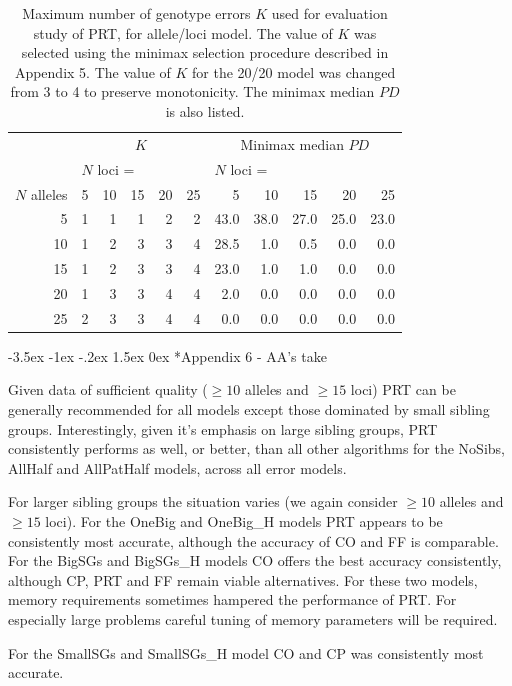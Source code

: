 \documentclass[twoside,10pt,twocolumn]{article}
\makeatletter
\renewcommand\section{\@startsection {section}{1}{\z@}%
                                   {-3.5ex \@plus -1ex \@minus -.2ex}%
                                   {1.5ex \@plus 0ex}%
                                   {\normalfont\normalsize\bfseries}}
\makeatother
\begin{document}
\begin{table}
\caption{Maximum number of genotype errors $K$ used for evaluation study of PRT, for allele/loci model. The 
value of $K$ was selected using the minimax selection procedure described in Appendix 5. The value of $K$ 
for the 20/20 model was changed from 3 to 4 to preserve monotonicity. The minimax median $PD$ is also 
listed.}\label{k.table}
\centering
\begin{tabular}{r|rrrrr|rrrrr} \hline
  & \multicolumn{5}{c|}{$K$} & \multicolumn{5}{c}{Minimax median $PD$} \\
 & \multicolumn{5}{l|}{$N$ loci =} & \multicolumn{5}{l}{$N$ loci =} \\
$N$ alleles  & 5 & 10 & 15 & 20 & 25 & 5 & 10 & 15 & 20 & 25 \\ 
  \hline
5 & 1 & 1 & 1 & 2 & 2 & 43.0 & 38.0 & 27.0 & 25.0 & 23.0 \\ 
  10 & 1 & 2 & 3 & 3 & 4 & 28.5 & 1.0 & 0.5 & 0.0 & 0.0 \\ 
  15 & 1 & 2 & 3 & 3 & 4 & 23.0 & 1.0 & 1.0 & 0.0 & 0.0 \\ 
  20 & 1 & 3 & 3 & 4 & 4 & 2.0 & 0.0 & 0.0 & 0.0 & 0.0 \\ 
  25 & 2 & 3 & 3 & 4 & 4 & 0.0 & 0.0 & 0.0 & 0.0 & 0.0 \\ 
   \hline
\end{tabular}
\end{table}


\section*{Appendix 6 - AA's take} 

Given data of sufficient quality ($\geq 10$ alleles and $\geq 15$ loci) PRT can be generally recommended for 
all models except those dominated by small sibling groups. Interestingly, given it's emphasis on large 
sibling groups, PRT consistently performs as well, or better, than all other algorithms for the NoSibs, 
AllHalf and AllPatHalf models, across all error models. 

For larger sibling groups the situation varies (we again consider $\geq 10$ alleles and $\geq 15$ loci). For 
the OneBig and OneBig\_H models PRT appears to be consistently most accurate, although the accuracy of CO 
and FF is comparable. For the BigSGs and BigSGs\_H models CO offers the best accuracy consistently, although 
CP, PRT and FF remain viable alternatives. For these two models, memory requirements sometimes hampered the 
performance of PRT. For especially large problems careful tuning of memory parameters will be required. 

For the SmallSGs and  SmallSGs\_H model CO and CP was consistently most accurate.   




{\footnotesize
}
\end{document}
